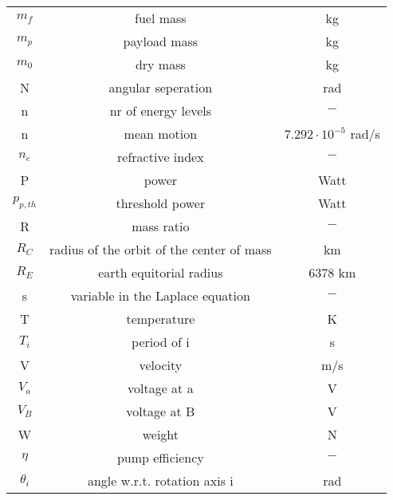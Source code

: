 \begin{center}
\begin{longtable}{c|c|c}
        $m_f$ &  fuel mass &         kg \\

        $m_p$ & payload mass &         kg \\

        $m_0$ &   dry mass &         kg \\

         N & angular seperation &        rad \\

         n & nr of energy levels &          $-$ \\

         n & mean motion & $7.292\cdot 10^{ - 5}$ rad/s \\

        $n_e$ & refractive index &          $-$ \\

         P &      power &       Watt \\

     $p_{p,th}$ & threshold power &       Watt \\

         R & mass ratio &          $-$ \\

        $R_C$ & radius of the orbit of the center of mass &         km \\

        $R_E$ & earth equitorial radius &    6378 km \\

         s & variable in the Laplace equation &          $-$ \\

         T & temperature &          K \\

        $T_i$ & period of i &          s \\

         V &   velocity &        m/s \\

        $V_a$ & voltage at a &          V \\

        $V_B$ & voltage at B &          V \\

         W &     weight &          N \\

         $\eta$ & pump efficiency &          $-$ \\

        $\theta _i$ & angle w.r.t. rotation axis i &        rad \\


\end{longtable}
\end{center}
